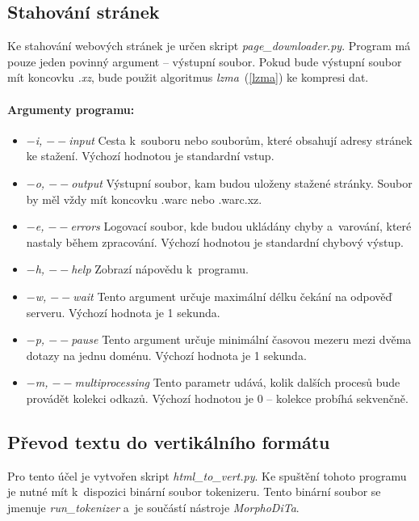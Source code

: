 \subsection{Stahování stránek}
Ke stahování webových stránek je určen skript \textit{page\_downloader.py}. Program má
pouze jeden povinný argument -- výstupní soubor. Pokud bude výstupní soubor mít koncovku
\textit{.xz}, bude použit algoritmus \textit{lzma}~(\ref{lzma}) ke kompresi dat.

\paragraph{Argumenty programu: }
\begin{itemize}
    \item \textit{$-$i, $--$input} Cesta k~souboru nebo souborům, které obsahují adresy stránek ke stažení. Výchozí hodnotou je standardní vstup.
    \item \textit{$-$o, $--$output} Výstupní soubor, kam budou uloženy stažené stránky. Soubor by měl vždy mít koncovku .warc nebo .warc.xz.
    \item \textit{$-$e, $--$errors} Logovací soubor, kde budou ukládány chyby a~varování, které nastaly během zpracování. Výchozí hodnotou je standardní chybový výstup.
    \item \textit{$-$h, $--$help} Zobrazí nápovědu k~programu.
    \item \textit{$-$w, $--$wait} Tento argument určuje maximální délku čekání na odpověď serveru. Výchozí hodnota je 1 sekunda.
    \item \textit{$-$p, $--$pause} Tento argument určuje minimální časovou mezeru mezi dvěma dotazy na jednu doménu. Výchozí hodnota je 1 sekunda.
    \item \textit{$-$m, $--$multiprocessing} Tento parametr udává, kolik dalších procesů bude provádět kolekci odkazů. Výchozí hodnotou je 0 -- kolekce probíhá sekvenčně.
\end{itemize}

\subsection{Převod textu do vertikálního formátu}
Pro tento účel je vytvořen skript \textit{html\_to\_vert.py}. Ke spuštění tohoto programu je nutné mít
k~dispozici binární soubor tokenizeru. Tento binární soubor se jmenuje \textit{run\_tokenizer} a~je
součástí nástroje \textit{MorphoDiTa}.

